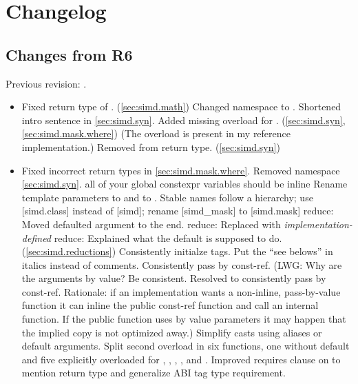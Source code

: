 \section{Changelog}
\subsection{Changes from R6}
Previous revision: \parencite{P0214R6}.
\begin{itemize}
  \item Fixed return type of . (\ref{sec:simd.math})
  \chck Changed namespace to .
  \chck Shortened intro sentence in \ref{sec:simd.syn}.
  \chck Added missing  overload for . (\ref{sec:simd.syn}, \ref{sec:simd.mask.where}) (The overload is present in my reference implementation.)
  \chck Removed  from  return type. (\ref{sec:simd.syn})
  \item Fixed incorrect  return types in \ref{sec:simd.mask.where}.
  \chck Removed  namespace \ref{sec:simd.syn}.
  \chck all of your global constexpr variables should be inline
  \chck Rename template parameters  to  and  to .
  \chck Stable names follow a hierarchy; use [simd.class] instead of [simd]; rename [simd_mask] to [simd.mask]
  \chck reduce: Moved defaulted  argument to the end.
  \chck reduce: Replaced  with \emph{implementation-defined}
  \chck reduce: Explained what the default  is supposed to do. (\ref{sec:simd.reductions})
  \chck Consistently initialze tags.
  \chck Put the “see belows” in italics instead of comments.
  \chck Consistently pass by const-ref.
  (LWG: Why are the arguments by value?
  Be consistent.
  Resolved to consistently pass by const-ref. Rationale: if an implementation wants a non-inline, pass-by-value function it can inline the public const-ref function and call an internal function.
  If the public function uses by value parameters it may happen that the implied copy is not optimized away.)
  \chck Simplify casts using aliases or default arguments.
  \chck Split second  overload in six functions, one without default  and five explicitly overloaded for , , , , and .
  \chck Improved requires clause on  to mention return type and generalize ABI tag type requirement.

\end{itemize}
